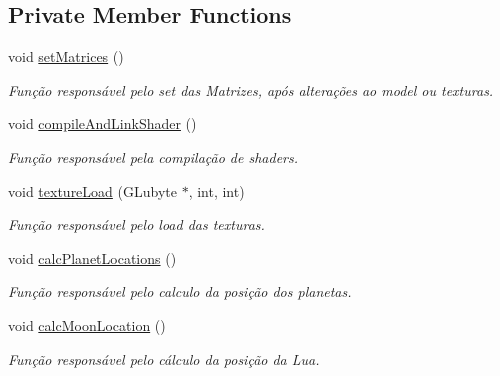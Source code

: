 \subsection*{Private Member Functions}
\begin{DoxyCompactItemize}
\item 
void \mbox{\hyperlink{class_scene_texture_afbdc7b7c4eaa91deadd5f907ca501f7b}{set\+Matrices}} ()
\begin{DoxyCompactList}\small\item\em Função responsável pelo set das Matrizes, após alterações ao model ou texturas. \end{DoxyCompactList}\item 
void \mbox{\hyperlink{class_scene_texture_ab6fca6f40d60e7e5fd673cd3bbc2bd7b}{compile\+And\+Link\+Shader}} ()
\begin{DoxyCompactList}\small\item\em Função responsável pela compilação de shaders. \end{DoxyCompactList}\item 
void \mbox{\hyperlink{class_scene_texture_ab923e8fdecd6aa437dfe19c89f604e6b}{texture\+Load}} (G\+Lubyte $\ast$, int, int)
\begin{DoxyCompactList}\small\item\em Função responsável pelo load das texturas. \end{DoxyCompactList}\item 
void \mbox{\hyperlink{class_scene_texture_adcb3a2fbf04c722a62e52f82f3ff81c8}{calc\+Planet\+Locations}} ()
\begin{DoxyCompactList}\small\item\em Função responsável pelo calculo da posição dos planetas. \end{DoxyCompactList}\item 
void \mbox{\hyperlink{class_scene_texture_a0f8c125b6518c0903c2e47ac7d5b926a}{calc\+Moon\+Location}} ()
\begin{DoxyCompactList}\small\item\em Função responsável pelo cálculo da posição da Lua. \end{DoxyCompactList}\end{DoxyCompactItemize}
